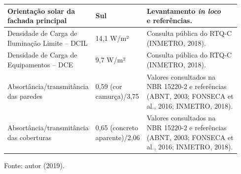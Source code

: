 \begin{table}[H]
\begin{tabular*}{\columnwidth}{@{\extracolsep{\fill}}lll}
        \makecell[l]{Orientação solar da \\fachada principal}          & Sul                                                                                   & \makecell[l]{Levantamento \textit{in loco}\\ e referências.}                                                                                                             \\ \hline
        \makecell[l]{Densidade de Carga de\\ Iluminação Limite – DCIL} & 14,1 W/m²                                                                             & \makecell[l]{Consulta pública do RTQ-C \\(INMETRO, 2018).}                                                                                                               \\ \hline
        \makecell[l]{Densidade de Carga de\\ Equipamentos – DCE}       & 9,7 W/m²                                                                              & \makecell[l]{Consulta pública do RTQ-C \\(INMETRO, 2018).}                                                                                                               \\ \hline
        \makecell[l]{Absortância/transmitância \\das paredes}          & \makecell[l]{0,59 (cor \\camurça)/3,75}                                               & \makecell[l]{Valores consultados na \\NBR 15220-2 e referências \\(ABNT, 2003; FONSECA et \\al., 2016; INMETRO, 2018).}                                                                     \\ \hline
        \makecell[l]{Absortância/transmitância \\das coberturas}       & \makecell[l]{0,65 (concreto \\aparente)/2,06}                                         & \makecell[l]{Valores consultados na \\NBR 15220-2 e referências \\(ABNT, 2003; FONSECA et \\al., 2016; INMETRO, 2018).}                                                 \\ \hline
        \end{tabular*}
        \begin{flushleft}
            \par \small Fonte: autor (2019).
        \end{flushleft}
    \end{table}\vspace*{-0.3cm}

